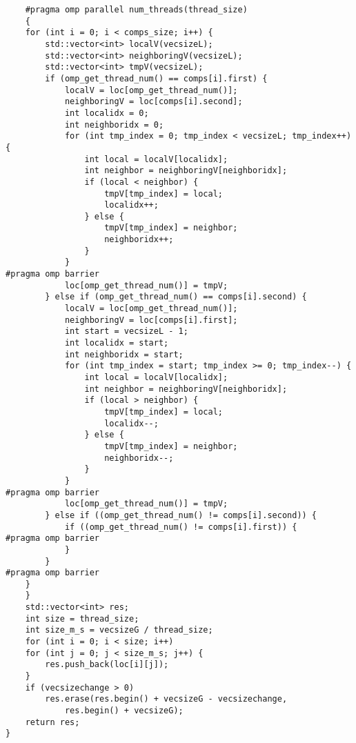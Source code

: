 \documentclass{report}
\begin{document}
\begin{lstlisting}
    #pragma omp parallel num_threads(thread_size)
    {
    for (int i = 0; i < comps_size; i++) {
        std::vector<int> localV(vecsizeL);
        std::vector<int> neighboringV(vecsizeL);
        std::vector<int> tmpV(vecsizeL);
        if (omp_get_thread_num() == comps[i].first) {
            localV = loc[omp_get_thread_num()];
            neighboringV = loc[comps[i].second];
            int localidx = 0;
            int neighboridx = 0;
            for (int tmp_index = 0; tmp_index < vecsizeL; tmp_index++) {
                int local = localV[localidx];
                int neighbor = neighboringV[neighboridx];
                if (local < neighbor) {
                    tmpV[tmp_index] = local;
                    localidx++;
                } else {
                    tmpV[tmp_index] = neighbor;
                    neighboridx++;
                }
            }
#pragma omp barrier
            loc[omp_get_thread_num()] = tmpV;
        } else if (omp_get_thread_num() == comps[i].second) {
            localV = loc[omp_get_thread_num()];
            neighboringV = loc[comps[i].first];
            int start = vecsizeL - 1;
            int localidx = start;
            int neighboridx = start;
            for (int tmp_index = start; tmp_index >= 0; tmp_index--) {
                int local = localV[localidx];
                int neighbor = neighboringV[neighboridx];
                if (local > neighbor) {
                    tmpV[tmp_index] = local;
                    localidx--;
                } else {
                    tmpV[tmp_index] = neighbor;
                    neighboridx--;
                }
            }
#pragma omp barrier
            loc[omp_get_thread_num()] = tmpV;
        } else if ((omp_get_thread_num() != comps[i].second)) {
            if ((omp_get_thread_num() != comps[i].first)) {
#pragma omp barrier
            }
        }
#pragma omp barrier
    }
    }
    std::vector<int> res;
    int size = thread_size;
    int size_m_s = vecsizeG / thread_size;
    for (int i = 0; i < size; i++)
    for (int j = 0; j < size_m_s; j++) {
        res.push_back(loc[i][j]);
    }
    if (vecsizechange > 0)
        res.erase(res.begin() + vecsizeG - vecsizechange,
            res.begin() + vecsizeG);
    return res;
}
\end{lstlisting}
\end{document}
